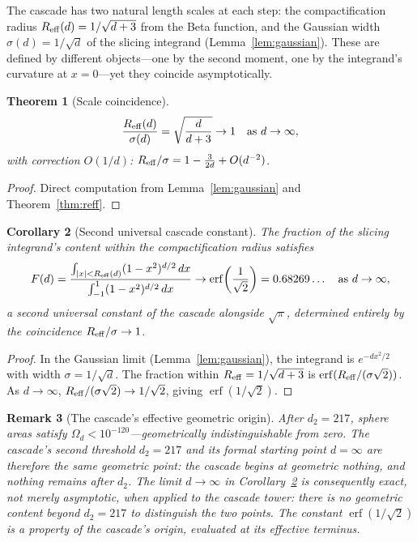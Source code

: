 \documentclass[12pt,a4paper]{article}
\newtheorem{theorem}{Theorem}[section]
\newtheorem{corollary}[theorem]{Corollary}
\newtheorem{remark}[theorem]{Remark}
\begin{document}
The cascade has two natural length scales at each step: the compactification radius
$R_{\rm eff}(d) = 1/\sqrt{d+3}$ from the Beta function, and the Gaussian width
$\sigma(d) = 1/\sqrt{d}$ of the slicing integrand (Lemma~\ref{lem:gaussian}). These
are defined by different objects---one by the second moment, one by the integrand's
curvature at $x = 0$---yet they coincide asymptotically.

\begin{theorem}[Scale coincidence]\label{thm:scale}
\[
\frac{R_{\rm eff}(d)}{\sigma(d)} = \sqrt{\frac{d}{d+3}} \to 1 \quad\text{as }
d\to\infty,
\]
with correction $O(1/d)$: $R_{\rm eff}/\sigma = 1 - \frac{3}{2d} + O(d^{-2})$.
\end{theorem}
\begin{proof}
Direct computation from Lemma~\ref{lem:gaussian} and Theorem~\ref{thm:reff}.
\end{proof}

\begin{corollary}[Second universal cascade constant]\label{cor:erf}
The fraction of the slicing integrand's content within the compactification radius
satisfies
\[
F(d) = \frac{\int_{|x|<R_{\rm eff}(d)}(1-x^2)^{d/2}\,dx}
{\int_{-1}^{1}(1-x^2)^{d/2}\,dx}
\to \operatorname{erf}\!\left(\frac{1}{\sqrt{2}}\right) = 0.68269\ldots
\quad\text{as }d\to\infty,
\]
a second universal constant of the cascade alongside $\sqrt{\pi}$, determined entirely
by the coincidence $R_{\rm eff}/\sigma\to 1$.
\end{corollary}
\begin{proof}
In the Gaussian limit (Lemma~\ref{lem:gaussian}), the integrand is
$e^{-dx^2/2}$ with width $\sigma = 1/\sqrt{d}$. The fraction within
$R_{\rm eff} = 1/\sqrt{d+3}$ is
$\operatorname{erf}(R_{\rm eff}/(\sigma\sqrt{2}))$. As $d\to\infty$,
$R_{\rm eff}/(\sigma\sqrt{2})\to 1/\sqrt{2}$, giving
$\operatorname{erf}(1/\sqrt{2})$.
\end{proof}

\begin{remark}[The cascade's effective geometric origin]
After $d_2 = 217$, sphere areas satisfy $\Omega_d < 10^{-120}$---geometrically
indistinguishable from zero. The cascade's second threshold $d_2 = 217$ and its formal
starting point $d = \infty$ are therefore the same geometric point: the cascade begins at
geometric nothing, and nothing remains after $d_2$. The limit $d\to\infty$ in
Corollary~\ref{cor:erf} is consequently exact, not merely asymptotic, when applied to the
cascade tower: there is no geometric content beyond $d_2 = 217$ to distinguish the two
points. The constant $\operatorname{erf}(1/\sqrt{2})$ is a property of the cascade's
origin, evaluated at its effective terminus.
\end{remark}
\end{document}

